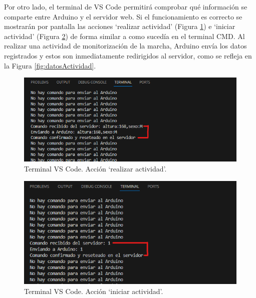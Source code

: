 Por otro lado, el terminal de VS Code permitirá comprobar qué información se comparte entre Arduino y el servidor web. Si el funcionamiento es correcto se mostrarán por pantalla las acciones `realizar actividad' (Figura \ref{fig:realizarActividad}) e  `iniciar actividad' (Figura \ref{fig:iniciarActividad}) de forma similar a como sucedía en el terminal CMD. Al realizar una actividad de monitorización de la marcha, Arduino envía los datos registrados y estos son inmediatamente redirigidos al servidor, como se refleja en la Figura \ref{fig:datosActividad}.

\begin{figure}[h]
    \centering
    \includegraphics[width=1\textwidth]{img/C2_PruebasSistema/realizarActividad.png}
    \caption{Terminal VS Code. Acción `realizar actividad'.}
    \label{fig:realizarActividad}
\end{figure}

\begin{figure}[h]
    \centering
    \includegraphics[width=1\textwidth]{img/C2_PruebasSistema/iniciarActividad.png}
    \caption{Terminal VS Code. Acción `iniciar actividad'.}
    \label{fig:iniciarActividad}
\end{figure}

